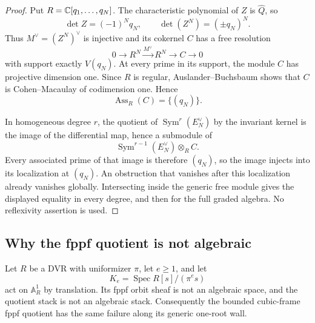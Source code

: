 \begin{proof}
Put \(R=\mathbb C[q_1,\ldots,q_N]\).  The characteristic polynomial of \(Z\) is
\(\widehat Q\), so
\[
\det Z=(-1)^Nq_N,
\qquad
\det(Z^N)=(\pm q_N)^N.
\]
Thus \(M^\vee=(Z^N)^\vee\) is injective and its cokernel \(C\) has a free
resolution
\[
0\longrightarrow R^N\xrightarrow{M^\vee}R^N
\longrightarrow C\longrightarrow0
\]
with support exactly \(V(q_N)\).  At every prime in its support, the module
\(C\) has
projective dimension one.  Since \(R\) is regular, Auslander--Buchsbaum
shows that \(C\) is Cohen--Macaulay of codimension one.  Hence
\[
\operatorname{Ass}_R(C)=\{(q_N)\}.
\]

In homogeneous degree \(r\), the quotient of
\(\operatorname{Sym}^r(E_N^\vee)\) by the invariant kernel is the image of
the differential map, hence a submodule of
\[
\operatorname{Sym}^{r-1}(E_N^\vee)\otimes_R C.
\]
Every associated prime of that image is therefore \((q_N)\), so the image
injects into its localization at \((q_N)\).  An obstruction that vanishes
after this localization already vanishes globally.  Intersecting inside the
generic free module gives the displayed equality in every degree, and then
for the full graded algebra.  No reflexivity assertion is used.
\end{proof}

\subsection{Why the fppf quotient is not algebraic}

\begin{theorem}
\label{thm:fppf-wall-nonalgebraic}
Let \(R\) be a DVR with uniformizer \(\pi\), let \(e\ge 1\), and let
\[
K_e=\operatorname{Spec} R[s]/(\pi^es)
\]
act on \(\mathbb A^1_R\) by translation.  Its fppf orbit sheaf is not an algebraic
space, and the quotient stack is not an algebraic stack.  Consequently the
bounded cubic-frame fppf quotient has the same failure along its generic
one-root wall.
\end{theorem}

